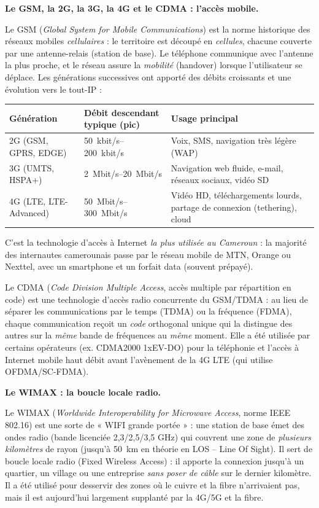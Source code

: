 \documentclass[11pt]{article}
\newcommand{\cle}[1]{{\popxbold\color{popdark}#1}}
\begin{document}
\textbf{Le GSM, la 2G, la 3G, la 4G et le CDMA : l'accès mobile.}\par
Le \cle{GSM} (\emph{Global System for Mobile Communications}) est la norme historique des réseaux mobiles \emph{cellulaires} : le territoire est découpé en \emph{cellules}, chacune couverte par une antenne-relais (station de base). Le téléphone communique avec l'antenne la plus proche, et le réseau assure la \emph{mobilité} (handover) lorsque l'utilisateur se déplace. Les générations successives ont apporté des débits croissants et une évolution vers le tout-IP :

\begin{center}
\begin{tabularx}{\linewidth}{|l|l|X|}
\hline
\rowcolor{popblueL} \textbf{Génération} & \textbf{Débit descendant typique (pic)} & \textbf{Usage principal} \\
\hline
2G (GSM, GPRS, EDGE) & \SIrange{50}{200}{kbit/s} & Voix, SMS, navigation très légère (WAP) \\
\hline
3G (UMTS, HSPA+) & \SIrange{2}{20}{Mbit/s} & Navigation web fluide, e-mail, réseaux sociaux, vidéo SD \\
\hline
4G (LTE, LTE-Advanced) & \SIrange{50}{300}{Mbit/s} & Vidéo HD, téléchargements lourds, partage de connexion (tethering), cloud \\
\hline
\end{tabularx}
\end{center}

C'est la technologie d'accès à Internet \emph{la plus utilisée au Cameroun} : la majorité des internautes camerounais passe par le réseau mobile de MTN, Orange ou Nexttel, avec un smartphone et un forfait data (souvent prépayé).

Le \cle{CDMA} (\emph{Code Division Multiple Access}, accès multiple par répartition en code) est une technologie d'accès radio concurrente du GSM/TDMA : au lieu de séparer les communications par le temps (TDMA) ou la fréquence (FDMA), chaque communication reçoit un \emph{code} orthogonal unique qui la distingue des autres sur la \emph{même} bande de fréquences au \emph{même} moment. Elle a été utilisée par certains opérateurs (ex. CDMA2000 1xEV-DO) pour la téléphonie et l'accès à Internet mobile haut débit avant l'avènement de la 4G LTE (qui utilise OFDMA/SC-FDMA).

\textbf{Le WIMAX : la boucle locale radio.}\par
Le \cle{WIMAX} (\emph{Worldwide Interoperability for Microwave Access}, norme \cle{IEEE 802.16}) est une sorte de « WIFI grande portée » : une station de base émet des ondes radio (bande licenciée 2,3/2,5/3,5 GHz) qui couvrent une zone de \emph{plusieurs kilomètres} de rayon (jusqu'à \SI{50}{km} en théorie en LOS -- Line Of Sight). Il sert de \cle{boucle locale radio} (Fixed Wireless Access) : il apporte la connexion jusqu'à un quartier, un village ou une entreprise \emph{sans poser de câble} sur le dernier kilomètre. Il a été utilisé pour desservir des zones où le cuivre et la fibre n'arrivaient pas, mais il est aujourd'hui largement supplanté par la 4G/5G et la fibre.
\end{document}
